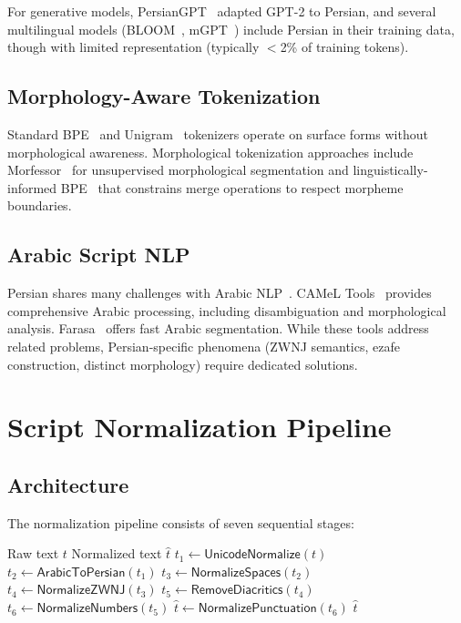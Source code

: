 \documentclass[11pt,a4paper]{article}
\begin{document}
For generative models, PersianGPT~\citep{persiangpt2023} adapted GPT-2 to Persian, and several multilingual models (BLOOM~\citep{scao2022bloom}, mGPT~\citep{shliazhko2024mgpt}) include Persian in their training data, though with limited representation (typically $<$2\% of training tokens).

\subsection{Morphology-Aware Tokenization}

Standard BPE~\citep{sennrich2016neural} and Unigram~\citep{kudo2018sentencepiece} tokenizers operate on surface forms without morphological awareness. Morphological tokenization approaches include Morfessor~\citep{virpioja2013morfessor} for unsupervised morphological segmentation and linguistically-informed BPE~\citep{saleva2021ethio} that constrains merge operations to respect morpheme boundaries.

\subsection{Arabic Script NLP}

Persian shares many challenges with Arabic NLP~\citep{habash2010arabic}. CAMeL Tools~\citep{obeid2020camel} provides comprehensive Arabic processing, including disambiguation and morphological analysis. Farasa~\citep{abdelali2016farasa} offers fast Arabic segmentation. While these tools address related problems, Persian-specific phenomena (ZWNJ semantics, ezafe construction, distinct morphology) require dedicated solutions.

\section{Script Normalization Pipeline}

\subsection{Architecture}

The normalization pipeline consists of seven sequential stages:

\begin{algorithm}[H]
\caption{Persian Text Normalization Pipeline}
\label{alg:normalize}
\begin{algorithmic}[1]
\Require Raw text $t$
\Ensure Normalized text $\hat{t}$
\State $t_1 \leftarrow \mathsf{UnicodeNormalize}(t)$ 
\State $t_2 \leftarrow \mathsf{ArabicToPersian}(t_1)$ 
\State $t_3 \leftarrow \mathsf{NormalizeSpaces}(t_2)$ 
\State $t_4 \leftarrow \mathsf{NormalizeZWNJ}(t_3)$ 
\State $t_5 \leftarrow \mathsf{RemoveDiacritics}(t_4)$ 
\State $t_6 \leftarrow \mathsf{NormalizeNumbers}(t_5)$ 
\State $\hat{t} \leftarrow \mathsf{NormalizePunctuation}(t_6)$ 
\State \Return $\hat{t}$
\end{algorithmic}
\end{algorithm}
\end{document}
